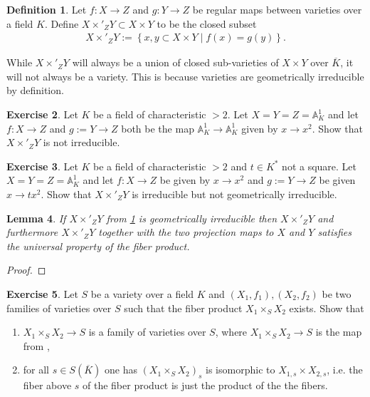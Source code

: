 \documentclass[a4paper,12pt,reqno]{amsart}
\newcommand{\set}[1]{\left\lbrace #1 \right\rbrace}
\newcommand{\field}[1]{\mathbb{#1}}  %
\newcommand{\A}{\field{A}}
\newtheorem{lemma}{Lemma}
\theoremstyle{definition}
\newtheorem{definition}[lemma]{Definition}
\newtheorem{exercise}[lemma]{Exercise}
\numberwithin{lemma}{section}
\numberwithin{equation}{section}
\numberwithin{figure}{section}
\begin{document}
\begin{definition}\label{def:fiber_product_concrete}
Let $f: X \to Z$ and $g : Y \to Z$ be regular maps between varieties over a field $K$. Define $X\times'_Z Y \subset X \times Y$ to be the closed subset
\begin{align*}
X\times'_Z Y :=\set{x,y \subset X \times Y \mid f(x)=g(y)}.
\end{align*}
\end{definition}

While $X\times'_Z Y$ will always be a union of closed sub-varieties of $X \times Y$ over $\overline K$, it will not always be a variety. This is because varieties are geometrically irreducible by definition.

\begin{exercise}
Let $K$ be a field of characteristic $>2$.	Let $X = Y = Z = \A^1_K$ and let $f: X \to Z$ and $g := Y\to Z$ both be the map $\A^1_K \to   \A^1_K$ given by $x \to x^2$. Show that $X\times'_Z Y$ is not irreducible.
\end{exercise}

\begin{exercise}
	Let $K$ be a field of characteristic $>2$ and $t \in K^*$ not a square.	Let $X = Y = Z = \A^1_K$ and let $f: X \to Z$ be given by $x \to x^2$ and $g := Y\to Z$ be given $x \to tx^2$. Show that $X\times'_Z Y$ is irreducible but not geometrically irreducible.
\end{exercise}

\begin{lemma}
If $X\times'_Z Y$ from \cref{def:fiber_product_concrete} is geometrically irreducible then $X\times'_Z Y$ and furthermore $X\times'_Z Y$ together with the two projection maps to $X$ and $Y$ satisfies the universal property of the fiber product.
\end{lemma}
\begin{proof}
\end{proof}

\begin{exercise}
	Let $S$ be a variety over a field $K$ and $(X_1,f_1), (X_2,f_2)$ be two families of varieties over $S$ such that the fiber product $X_1 \times_S X_2$ exists. Show that 
	\begin{enumerate}
		\item $X_1 \times_S X_2 \to S$ is a family of varieties over $S$, where $X_1 \times_S X_2 \to S$ is the map from ,
		\item for all $s \in S(\overline K)$ one has $(X_1 \times_S X_2)_s$ is isomorphic to $X_{1,s} \times X_{2,s}$, i.e. the fiber above $s$ of the fiber product is just the product of the the fibers.

	\end{enumerate}
\end{exercise}
\end{document}
